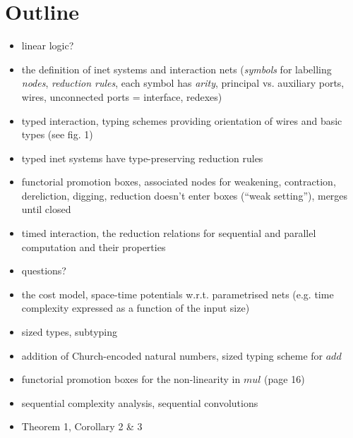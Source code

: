 \documentclass{fit-teorsem}
\begin{document}
\maketsheader
\thispagestyle{empty}
\section*{Outline}
\begin{itemize}
	\item linear logic?
	\item the definition of inet systems and interaction nets (\textit{symbols} for labelling \textit{nodes},
		\textit{reduction rules}, each symbol has \textit{arity}, principal vs. auxiliary ports, wires,
		unconnected ports = interface, redexes)
	\item typed interaction, typing schemes providing orientation of wires and basic types (see fig. 1)
	\item typed inet systems have type-preserving reduction rules
	\item functorial promotion boxes, associated nodes for weakening, contraction, dereliction, digging,
		reduction doesn't enter boxes (``weak setting''), merges until closed
	\item timed interaction, the reduction relations for sequential and parallel computation and
		their properties
	\item questions?
	\item the cost model, space-time potentials w.r.t. parametrised nets (e.g. time complexity
		expressed as a function of the input size)
	\item sized types, subtyping
	\item addition of Church-encoded natural numbers, sized typing scheme for $add$ 
	\item functorial promotion boxes for the non-linearity in $mul$ (page 16)
	\item sequential complexity analysis, sequential convolutions
	\item Theorem 1, Corollary 2 \& 3
\end{itemize}
\end{document}

